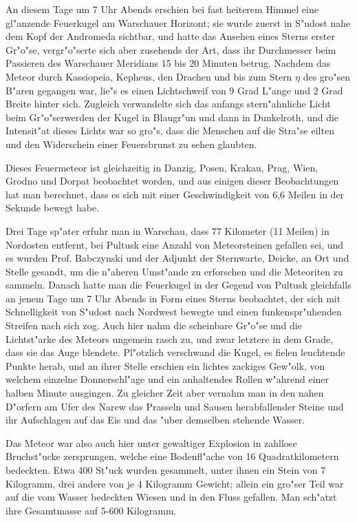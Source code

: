 \documentclass[a4paper, 11pt, oneside]{article}
\begin{document}
An diesem Tage um 7 Uhr Abends erschien bei fast heiterem Himmel eine gl"anzende Feuerkugel am Warschauer Horizont; sie wurde zuerst in S"udost nahe dem Kopf der Andromeda sichtbar, und hatte das Ansehen eines Sterns erster Gr"o"se, vergr"o"serte sich aber zusehends der Art, dass ihr Durchmesser beim Passieren des Warschauer Meridians 15 bis 20 Minuten betrug. Nachdem das Meteor durch Kassiopeia, Kepheus, den Drachen und bis zum Stern $\eta$ des gro"sen B"aren gegangen war, lie"s es einen Lichtschweif von 9 Grad L"ange und 2 Grad Breite hinter sich. Zugleich verwandelte sich das anfangs stern"ahnliche Licht beim Gr"o"serwerden der Kugel in Blaugr"un und dann in Dunkelroth, und die Intensit"at dieses Lichts war so gro"s, dass die Menschen auf die Stra"se eilten und den Widerschein einer Feuersbrunst zu sehen glaubten.

Dieses Feuermeteor ist gleichzeitig in Danzig, Posen, Krakau, Prag, Wien, Grodno und Dorpat beobachtet worden, und aus einigen dieser Beobachtungen hat man berechnet, dass es sich mit einer Geschwindigkeit von 6,6 Meilen in der Sekunde bewegt habe.

Drei Tage sp"ater erfuhr man in Warschau, dass 77 Kilometer (11 Meilen) in Nordosten entfernt, bei Pultusk eine Anzahl von Meteorsteinen gefallen sei, und es wurden Prof. Babczynski und der Adjunkt der Sternwarte, Deicke, an Ort und Stelle gesandt, um die n"aheren Umst"ande zu erforschen und die Meteoriten zu sammeln. Danach hatte man die Feuerkugel in der Gegend von Pultusk gleichfalls an jenem Tage um 7 Uhr Abends in Form eines Sterns beobachtet, der sich mit Schnelligkeit von S"udost nach Nordwest bewegte und einen funkenspr"uhenden Streifen nach sich zog. Auch hier nahm die scheinbare Gr"o"se und die Lichtst"arke des Meteors ungemein rasch zu, und zwar letztere in dem Grade, dass sie das Auge blendete. Pl"otzlich verschwand die Kugel, es fielen leuchtende Punkte herab, und an ihrer Stelle erschien ein lichtes zackiges Gew"olk, von welchem einzelne Donnerschl"age und ein anhaltendes Rollen w"ahrend einer halben Minute ausgingen. Zu gleicher Zeit aber vernahm man in den nahen D"orfern am Ufer des Narew das Prasseln und Sausen herabfallender Steine und ihr Aufschlagen auf das Eis und das "uber demselben stehende Wasser.

Das Meteor war also auch hier unter gewaltiger Explosion in zahllose Bruchst"ucke zersprungen, welche eine Bodenfl"ache von 16 Quadratkilometern bedeckten. Etwa 400 St"uck wurden gesammelt, unter ihnen ein Stein von 7 Kilogramm, drei andere von je 4 Kilogramm Gewicht; allein ein gro"ser Teil war auf die vom Wasser bedeckten Wiesen und in den Fluss gefallen. Man sch"atzt ihre Gesamtmasse auf 5-600 Kilogramm.
\end{document}
